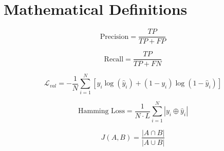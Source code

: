 \chapter{Mathematical Definitions}
\label{chap:math_def}



\begin{equation} \label{eq:precision}
\text{Precision} = \frac{TP}{TP + FP}
\end{equation}

\begin{equation} \label{eq:recall}
\text{Recall} = \frac{TP}{TP + FN}
\end{equation}

\begin{equation} \label{eq:val_loss}
\mathcal{L}_{val} = -\frac{1}{N} \sum_{i=1}^{N} [y_i \log(\hat{y}_i) + (1 - y_i) \log(1 - \hat{y}_i)]
\end{equation}

\begin{equation} \label{eq:hamming_loss_xor}
\text{Hamming Loss} = \frac{1}{N \cdot L} \sum_{i=1}^{N} |y_i \oplus \hat{y}_i|
\end{equation}

\begin{equation} \label{eq:jaccard_index}
J(A, B) = \frac{|A \cap B|}{|A \cup B|}
\end{equation}

